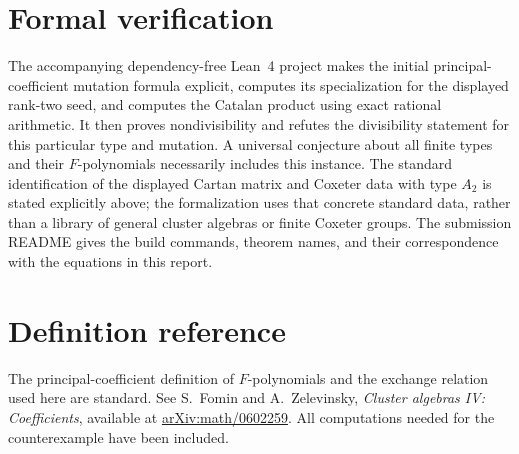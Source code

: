 \documentclass[11pt,a4paper]{article}
\begin{document}
\section{Formal verification}
The accompanying dependency-free Lean~4 project makes the initial
principal-coefficient mutation formula explicit, computes its
specialization for the displayed rank-two seed, and computes the
Catalan product using exact rational arithmetic. It then proves
nondivisibility and refutes the divisibility statement for this
particular type and mutation. A universal conjecture about all finite
types and their $F$-polynomials necessarily includes this instance.
The standard identification of the displayed Cartan matrix and Coxeter
data with type $A_2$ is stated explicitly above; the formalization uses
that concrete standard data, rather than a library of general cluster
algebras or finite Coxeter groups.
The submission README gives the build commands, theorem names,
and their correspondence with the equations in this report.

\section*{Definition reference}
The principal-coefficient definition of $F$-polynomials and the exchange
relation used here are standard. See S.~Fomin and A.~Zelevinsky,
\emph{Cluster algebras IV: Coefficients}, available at
\href{https://arxiv.org/abs/math/0602259}{arXiv:math/0602259}.
All computations needed for the counterexample have been included.
\end{document}
